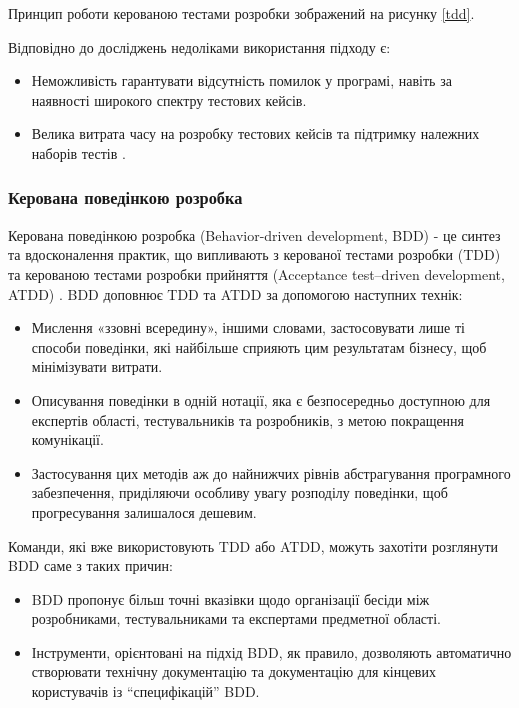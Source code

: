 Принцип роботи керованою тестами розробки зображений на рисунку \ref{tdd}.

Відповідно до досліджень недоліками використання підходу є:

\begin{itemize}
		\item Неможливість гарантувати відсутність помилок у програмі,
			навіть за наявності широкого спектру тестових кейсів.
		\item Велика витрата часу на розробку тестових кейсів
			та підтримку належних наборів тестів \cite{tdd-thesis}.
\end{itemize}


\subsubsection{Керована поведінкою розробка}

Керована поведінкою розробка (Behavior-driven development, BDD) 
- це синтез та вдосконалення практик, що випливають з
керованої тестами розробки (TDD) та керованою тестами розробки прийняття
(Acceptance test–driven development, ATDD) \cite{bdd-article}.
BDD доповнює TDD та ATDD за допомогою наступних технік:

\begin{itemize}
		\item Мислення «ззовні всередину», іншими словами, застосовувати
			лише ті способи поведінки, які найбільше сприяють цим результатам бізнесу,
			щоб мінімізувати витрати.
		\item Описування поведінки в одній нотації,
			яка є безпосередньо доступною для експертів області,
			тестувальників та розробників, з метою покращення комунікації.
		\item Застосування цих методів аж до найнижчих рівнів абстрагування
			програмного забезпечення, приділяючи особливу увагу розподілу поведінки,
			щоб прогресування залишалося дешевим.
\end{itemize}

Команди, які вже використовують TDD або ATDD, 
можуть захотіти розглянути BDD саме з таких причин:

\begin{itemize}
		\item BDD пропонує більш точні вказівки щодо організації бесіди між розробниками,
			тестувальниками та експертами предметної області.
		\item Інструменти, орієнтовані на підхід BDD, як правило,
			дозволяють автоматично створювати технічну документацію
			та документацію для кінцевих користувачів із “специфікацій” BDD.
\end{itemize}


